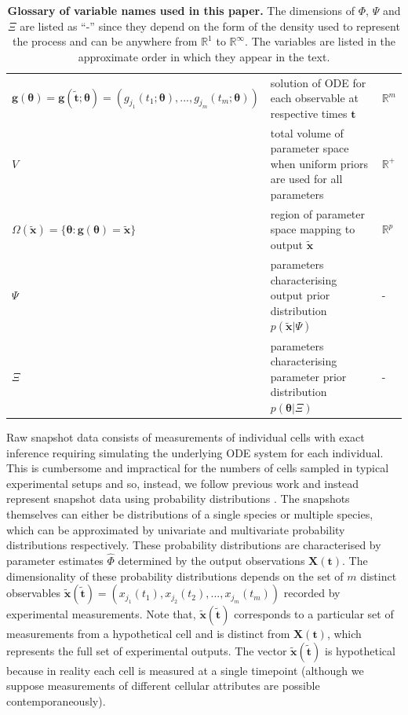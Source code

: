 \documentclass[10pt,letterpaper]{article}
\begin{document}
\begin{table}[htbp]
\begin{adjustwidth}{-2in}{-1in}
\begin{tabularx}{1.65\textwidth}{lll}
			$\boldsymbol{g}(\boldsymbol{\theta})=\boldsymbol{g}(\tilde{\boldsymbol{t}};\boldsymbol{\theta})=(g_{j_1}(t_1; \boldsymbol{\theta}),...,g_{j_m}(t_m; \boldsymbol{\theta}))$ & solution of ODE for each observable at respective times $\boldsymbol{t}$ & $\mathbb{R}^m$\\
			$V$ & total volume of parameter space when uniform priors are used for all parameters & $\mathbb{R}^+$\\
			$\Omega(\tilde{\boldsymbol{x}}) = \{\boldsymbol{\theta}: \boldsymbol{g}(\boldsymbol{\theta}) = \tilde{\boldsymbol{x}}\}$ & region of parameter space mapping to output $\tilde{\boldsymbol{x}}$ & $\mathbb{R}^p$\\
			$\Psi$ & parameters characterising output prior distribution $p(\tilde{\boldsymbol{x}}|\Psi)$ & -\\
			$\Xi$ & parameters characterising parameter prior distribution $p(\boldsymbol{\theta}|\Xi)$ & -
			\end{tabularx}
		\caption{\textbf{Glossary of variable names used in this paper.} The dimensions of $\Phi$, $\Psi$ and $\Xi$ are listed as ``-'' since they depend on the form of the density used to represent the process and can be anywhere from $\mathbb{R}^1$ to $\mathbb{R}^\infty$. The variables are listed in the approximate order in which they appear in the text.}
		\label{tab:variable_glossary}%
	\end{adjustwidth}
\end{table}%

Raw snapshot data consists of measurements of individual cells with exact inference requiring simulating the underlying ODE system for each individual. This is cumbersome and impractical for the numbers of cells sampled in typical experimental setups and so, instead, we follow previous work and instead represent snapshot data using probability distributions \cite{hasenauer2011identification,hasenauer2014ode,loos2018hierarchical,dixit2018maximum}. The snapshots themselves can either be distributions of a single species or multiple species, which can be approximated by univariate and multivariate probability distributions respectively. These probability distributions are characterised by parameter estimates $\hat{\Phi}$ determined by the output observations $\boldsymbol{X}(\boldsymbol{t})$. The dimensionality of these probability distributions depends on the set of $m$ distinct observables $\tilde{\boldsymbol{x}}(\tilde{\boldsymbol{t}})=(x_{j_1}(t_1), x_{j_2}(t_2), ..., x_{j_m}(t_m))$ recorded by experimental measurements. Note that, $\tilde{\boldsymbol{x}}(\tilde{\boldsymbol{t}})$ corresponds to a particular set of measurements from a hypothetical cell and is distinct from $\boldsymbol{X}(\boldsymbol{t})$, which represents the full set of experimental outputs. The vector $\tilde{\boldsymbol{x}}(\tilde{\boldsymbol{t}})$ is hypothetical because in reality each cell is measured at a single timepoint (although we suppose measurements of different cellular attributes are possible contemporaneously).
\end{document}
